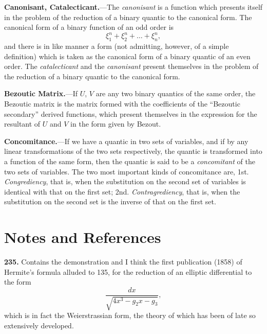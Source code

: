 \documentclass[11pt,a4paper]{book}
\begin{document}
\vspace{1em}

\noindent\textbf{Canonisant, Catalecticant.}---The \textit{canonisant} is a function which presents itself in the problem of the reduction of a binary quantic to the canonical form. The canonical form of a binary function of an odd order is
\[
\xi_1^n + \xi_2^n + \ldots + \xi_n^n,
\]
and there is in like manner a form (not admitting, however, of a simple definition) which is taken as the canonical form of a binary quantic of an even order. The \textit{catalecticant} and the \textit{canonisant} present themselves in the problem of the reduction of a binary quantic to the canonical form.

\vspace{1em}

\noindent\textbf{Bezoutic Matrix.}---If $U$, $V$ are any two binary quantics of the same order, the Bezoutic matrix is the matrix formed with the coefficients of the ``Bezoutic secondary'' derived functions, which present themselves in the expression for the resultant of $U$ and $V$ in the form given by Bezout.

\vspace{1em}

\noindent\textbf{Concomitance.}---If we have a quantic in two sets of variables, and if by any linear transformations of the two sets respectively, the quantic is transformed into a function of the same form, then the quantic is said to be a \textit{concomitant} of the two sets of variables. The two most important kinds of concomitance are, 1st. \textit{Congrediency}, that is, when the substitution on the second set of variables is identical with that on the first set; 2nd. \textit{Contragrediency}, that is, when the substitution on the second set is the inverse of that on the first set.

\newpage


\section*{Notes and References}

\noindent\textbf{235.} Contains the demonstration and I think the first publication (1858) of Hermite's formula alluded to 135, for the reduction of an elliptic differential to the form
\[
\frac{dx}{\sqrt{4x^3 - g_2 x - g_3}},
\]
which is in fact the Weierstrassian form, the theory of which has been of late so extensively developed.
\end{document}
